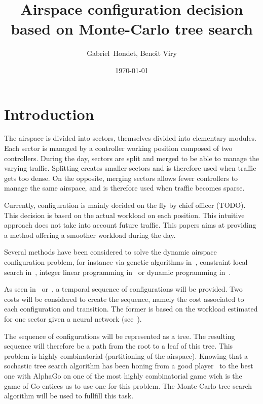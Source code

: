 \documentclass[twoside,twocolumn]{article}
\title{Airspace configuration decision based on Monte-Carlo tree search}
\author{Gabriel~Hondet, Beno\^{\i}t Viry}
\date{\today}
\begin{document}
\maketitle

\section{Introduction}
The airspace is divided into sectors, themselves divided into elementary
modules. Each sector is managed by a controller working position composed of two
controllers.
During the day, sectors are split and merged to be able to
manage the varying traffic. Splitting creates smaller sectors and is therefore
used when traffic gets too dense. On the opposite, merging sectors allows fewer
controllers to manage the same airspace, and is therefore used when traffic
becomes sparse.

Currently, configuration is mainly decided on the fly by chief officer (TODO).
This decision is based on the actual workload on each position. This intuitive
approach does not take into account future traffic. This papers aims at
providing a method offering a smoother workload during the day.

Several methods have been considered to solve the dynamic airspace configuration
problem, for instance via genetic algorithms in~\cite{sergeeva2017dynamic},
constraint local search in~\cite{jagare2013constraint}, integer linear
programming in~\cite{treimuth2016branch} or dynamic programming
in~\cite{bloem2010dynamic}.

As seen in~\cite{treimuth2016branch}
or~\cite{sergeeva2017dynamic}, a temporal sequence of configurations will be
provided. Two costs will be considered to create the sequence, namely the cost
associated to each configuration and transition. The former is based on the
workload estimated for one sector given a neural network
(see~\cite{gianazza2010forecasting}).

The sequence of configurations will be represented as a tree. The resulting
sequence will therefore be a path from the root to a leaf of this tree. This
problem is highly combinatorial (partitioning of the airspace). Knowing that a
sochastic tree search algorithm has been honing from a good
player~\cite{gelly2012go} to the best one with AlphaGo on one of the most highly
combinatorial game wich is the game of Go entices us to use one for this
problem. The Monte Carlo tree search~\cite{browne2012survey} algorithm will be
used to fullfill this task.
\end{document}
